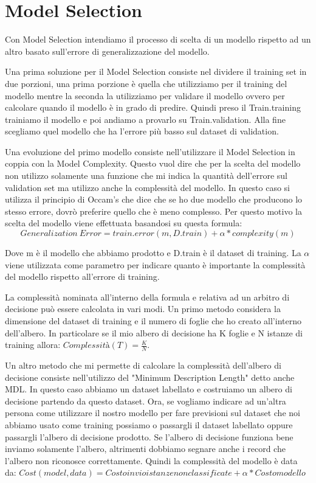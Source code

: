 \documentclass[14pt]{extreport}
\begin{document}
\section{Model Selection}

Con Model Selection intendiamo il processo di scelta di un modello rispetto ad un altro basato sull'errore di generalizzazione del modello.

Una prima soluzione per il Model Selection consiste nel dividere il training set in due porzioni, una prima porzione è quella che utilizziamo per il training del modello mentre la seconda la utilizziamo per validare il modello ovvero per calcolare quando il modello è in grado di predire.
Quindi preso il Train.training trainiamo il modello e poi andiamo a provarlo su Train.validation.
Alla fine scegliamo quel modello che ha l'errore più basso sul dataset di validation.

Una evoluzione del primo modello consiste nell'utilizzare il Model Selection in coppia con la Model Complexity. Questo vuol dire che per la scelta del modello non utilizzo solamente una funzione che mi indica la quantità dell'errore sul validation set ma utilizzo anche la complessità del modello.
In questo caso si utilizza il principio di Occam's che dice che se ho due modello che producono lo stesso errore, dovrò preferire quello che è meno complesso.
Per questo motivo la scelta del modello viene effettuata basandosi su questa formula:
\begin{equation}
    Generalization\ Error = train.error(m, D.train) + \alpha * complexity(m)
\end{equation}

Dove m è il modello che abbiamo prodotto e D.train è il dataset di training. La $\alpha$ viene utilizzata come parametro per indicare quanto è importante la complessità del modello rispetto all'errore di training.

La complessità nominata all'interno della formula e relativa ad un arbitro di decisione può essere calcolata in vari modi.
Un primo metodo considera la dimensione del dataset di training e il numero di foglie che ho creato all'interno dell'albero.
In particolare se il mio albero di decisione ha K foglie e N istanze di training allora: $Complessità(T) = \frac{K}{N}$.

Un altro metodo che mi permette di calcolare la complessità dell'albero di decisione consiste nell'utilizzo del "Minimum Description Length" detto anche MDL.
In questo caso abbiamo un dataset labellato e costruiamo un albero di decisione partendo da questo dataset. Ora, se vogliamo indicare ad un'altra persona come utilizzare il nostro modello per fare previsioni sul dataset che noi abbiamo usato come training possiamo o passargli il dataset labellato oppure passargli l'albero di decisione prodotto.
Se l'albero di decisione funziona bene inviamo solamente l'albero, altrimenti dobbiamo segnare anche i record che l'albero non riconosce correttamente.
Quindi la complessità del modello è data da:
\newline
$Cost(model,data) = Costo invio istanze non classificate + \alpha * Costo modello$
\end{document}
